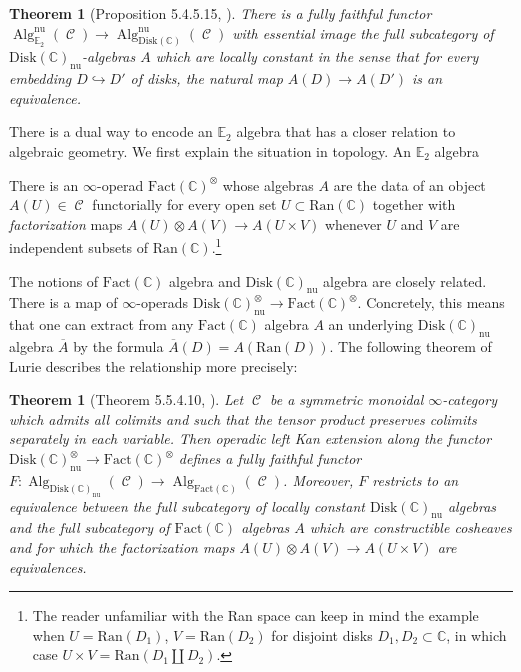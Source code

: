 \documentclass[reqno, oneside]{amsart}
\theoremstyle{definition}
\theoremstyle{plain}
\newtheorem{thm}[nul]{Theorem}
\DeclareMathOperator{\C}{\mathcal{C}}
\DeclareMathOperator{\Alg}{\mathrm{Alg}}
\begin{document}
\begin{thm}[Proposition 5.4.5.15, \cite{HA}]\label{thm:lcdisk}
There is a fully faithful functor $\Alg^{\mathrm{nu}}_{\mathbb{E}_2}(\C) \to \Alg^{\mathrm{nu}}_{\mathrm{Disk}(\mathbb{C})}(\C)$ with essential image the full subcategory of $\mathrm{Disk}(\mathbb{C})_{\mathrm{nu}}$-algebras $A$ which are \emph{locally constant} in the sense that for every embedding $D\hookrightarrow D'$ of disks, the natural map $A(D)\to A(D')$ is an equivalence.  
\end{thm}

There is a dual way to encode an $\mathbb{E}_2$ algebra that has a closer relation to algebraic geometry.  We first explain the situation in topology.  An $\mathbb{E}_2$ algebra 

There is an $\infty$-operad $\mathrm{Fact}(\mathbb{C})^{\otimes}$ whose algebras $A$ are the data of an object $A(U)\in\C$ functorially for every open set $U\subset \mathrm{Ran}(\mathbb{C})$ together with \emph{factorization} maps $A(U)\otimes A(V) \to A(U\times V)$ whenever $U$ and $V$ are independent subsets of $\mathrm{Ran}(\mathbb{C})$.\footnote{The reader unfamiliar with the Ran space can keep in mind the example when $U=\mathrm{Ran}(D_1)$, $V=\mathrm{Ran}(D_2)$ for disjoint disks $D_1,D_2\subset \mathbb{C}$, in which case $U\times V = \mathrm{Ran}(D_1\coprod D_2).$}

The notions of $\mathrm{Fact}(\mathbb{C})$ algebra and $\mathrm{Disk}(\mathbb{C})_{\mathrm{nu}}$ algebra are closely related.  There is a map of $\infty$-operads $\mathrm{Disk}(\mathbb{C})_{\mathrm{nu}}^\otimes \to \mathrm{Fact}(\mathbb{C})^\otimes.$  Concretely, this means that one can extract from any $\mathrm{Fact}(\mathbb{C})$ algebra $A$ an underlying $\mathrm{Disk}(\mathbb{C})_{\mathrm{nu}}$ algebra $\overline{A}$ by the formula $\overline{A}(D) = A(\mathrm{Ran}(D)).$  The following theorem of Lurie describes the relationship more precisely:

\begin{thm}[Theorem 5.5.4.10, \cite{HA}]
Let $\C$ be a symmetric monoidal $\infty$-category which admits all colimits and such that the tensor product preserves colimits separately in each variable.  Then operadic left Kan extension along the functor $\mathrm{Disk}(\mathbb{C})_{\mathrm{nu}}^\otimes \to \mathrm{Fact}(\mathbb{C})^\otimes$ defines a fully faithful functor $F: \Alg_{\mathrm{Disk}(\mathbb{C})_{\mathrm{nu}}}(\C) \to \Alg_{\mathrm{Fact}(\mathbb{C})}(\C)$.  Moreover, $F$ restricts to an equivalence between the full subcategory of locally constant $\mathrm{Disk}(\mathbb{C})_{\mathrm{nu}}$ algebras and the full subcategory of $\mathrm{Fact}(\mathbb{C})$ algebras $A$ which are constructible cosheaves and for which the factorization maps $A(U)\otimes A(V) \to A(U\times V)$ are equivalences.  
\end{thm}
\end{document}
